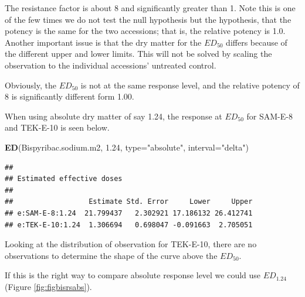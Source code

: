 \documentclass[letterpaper,]{book}
\newenvironment{Shaded}{\begin{snugshade}}{\end{snugshade}}
\newcommand{\DataTypeTok}[1]{\textcolor[rgb]{0.13,0.29,0.53}{#1}}
\newcommand{\FloatTok}[1]{\textcolor[rgb]{0.00,0.00,0.81}{#1}}
\newcommand{\KeywordTok}[1]{\textcolor[rgb]{0.13,0.29,0.53}{\textbf{#1}}}
\newcommand{\NormalTok}[1]{#1}
\newcommand{\StringTok}[1]{\textcolor[rgb]{0.31,0.60,0.02}{#1}}
\begin{document}
The resistance factor is about 8 and significantly greater than 1. Note this is one of the few times we do not test the null hypothesis but the hypothesis, that the potency is the same for the two accessions; that is, the relative potency is 1.0. Another important issue is that the dry matter for the \(ED_{50}\) differs because of the different upper and lower limits. This will not be solved by scaling the observation to the individual accessions' untreated control.

Obviously, the \(ED_{50}\) is not at the same response level, and the relative potency of 8 is significantly different form 1.00.

When using absolute dry matter of say 1.24, the response at \(ED_{50}\) for SAM-E-8 and TEK-E-10 is seen below.

\begin{Shaded}
\begin{Highlighting}[]
\KeywordTok{ED}\NormalTok{(Bispyribac.sodium.m2, }\FloatTok{1.24}\NormalTok{, }\DataTypeTok{type=}\StringTok{"absolute"}\NormalTok{, }\DataTypeTok{interval=}\StringTok{"delta"}\NormalTok{)}
\end{Highlighting}
\end{Shaded}

\begin{verbatim}
## 
## Estimated effective doses
## 
##                  Estimate Std. Error     Lower     Upper
## e:SAM-E-8:1.24  21.799437   2.302921 17.186132 26.412741
## e:TEK-E-10:1.24  1.306694   0.698047 -0.091663  2.705051
\end{verbatim}

Looking at the distribution of observation for TEK-E-10, there are no observations to determine the shape of the curve above the \(ED_{50}\).

If this is the right way to compare absolute response level we could use \(ED_{1.24}\) (Figure \ref{fig:figbisrsabs}).
\end{document}
